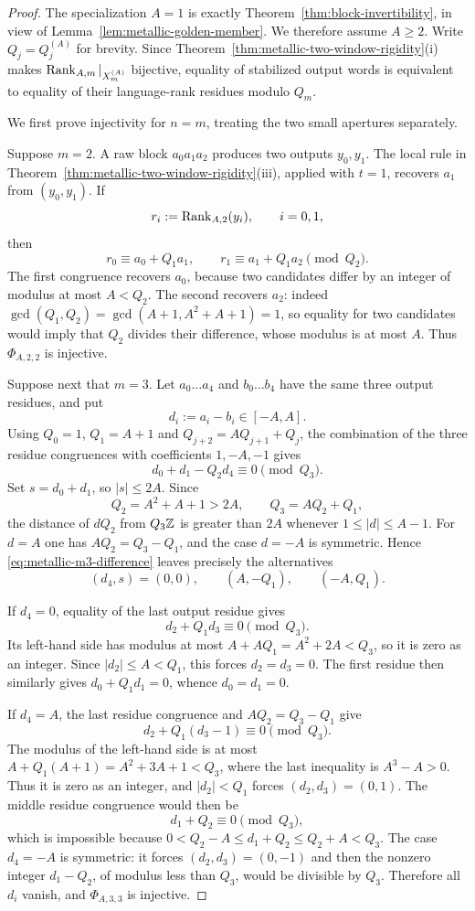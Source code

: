 \begin{proof}
The specialization $A=1$ is exactly
Theorem~\ref{thm:block-invertibility}, in view of
Lemma~\ref{lem:metallic-golden-member}.  We therefore assume $A\ge2$.
Write $Q_j=Q_j^{(A)}$ for brevity.  Since
Theorem~\ref{thm:metallic-two-window-rigidity}(i) makes
$\operatorname{Rank}_{A,m}|_{X_m^{(A)}}$ bijective, equality of stabilized output words is
equivalent to equality of their language-rank residues modulo $Q_m$.

We first prove injectivity for $n=m$, treating the two small apertures
separately.

Suppose $m=2$.  A raw block $a_0a_1a_2$ produces two outputs
$y_0,y_1$.  The local rule in
Theorem~\ref{thm:metallic-two-window-rigidity}(iii), applied with $t=1$,
recovers $a_1$ from $(y_0,y_1)$.  If
\[
r_i:=\operatorname{Rank}_{A,2}(y_i),\qquad i=0,1,
\]
then
\[
r_0\equiv a_0+Q_1a_1,\qquad
r_1\equiv a_1+Q_1a_2\pmod {Q_2}.
\]
The first congruence recovers $a_0$, because two candidates differ by an
integer of modulus at most $A<Q_2$.  The second recovers $a_2$: indeed
$\gcd(Q_1,Q_2)=\gcd(A+1,A^2+A+1)=1$, so equality for two candidates would
imply that $Q_2$ divides their difference, whose modulus is at most $A$.
Thus $\Phi_{A,2,2}$ is injective.

Suppose next that $m=3$.  Let $a_0\ldots a_4$ and $b_0\ldots b_4$ have the
same three output residues, and put
\[
d_i:=a_i-b_i\in[-A,A].
\]
Using $Q_0=1$, $Q_1=A+1$ and
$Q_{j+2}=AQ_{j+1}+Q_j$, the combination of the three residue congruences
with coefficients $1,-A,-1$ gives
\begin{equation}\label{eq:metallic-m3-difference}
d_0+d_1-Q_2d_4\equiv0\pmod {Q_3}.
\end{equation}
Set $s=d_0+d_1$, so $|s|\le2A$.  Since
\[
Q_2=A^2+A+1>2A,\qquad Q_3=AQ_2+Q_1,
\]
the distance of $dQ_2$ from $Q_3\mathbb{Z}$ is greater than $2A$ whenever
$1\le |d|\le A-1$.  For $d=A$ one has
$AQ_2=Q_3-Q_1$, and the case $d=-A$ is symmetric.  Hence
\eqref{eq:metallic-m3-difference} leaves precisely the alternatives
\[
(d_4,s)=(0,0),\qquad (A,-Q_1),\qquad(-A,Q_1).
\]

If $d_4=0$, equality of the last output residue gives
\[
d_2+Q_1d_3\equiv0\pmod {Q_3}.
\]
Its left-hand side has modulus at most $A+AQ_1=A^2+2A<Q_3$, so it is zero
as an integer.  Since $|d_2|\le A<Q_1$, this forces $d_2=d_3=0$.  The first
residue then similarly gives $d_0+Q_1d_1=0$, whence $d_0=d_1=0$.

If $d_4=A$, the last residue congruence and
$AQ_2=Q_3-Q_1$ give
\[
d_2+Q_1(d_3-1)\equiv0\pmod {Q_3}.
\]
The modulus of the left-hand side is at most
$A+Q_1(A+1)=A^2+3A+1<Q_3$, where the last inequality is
$A^3-A>0$.  Thus it is zero as an integer, and
$|d_2|<Q_1$ forces $(d_2,d_3)=(0,1)$.  The middle residue congruence would
then be
\[
d_1+Q_2\equiv0\pmod {Q_3},
\]
which is impossible because
$0<Q_2-A\le d_1+Q_2\le Q_2+A<Q_3$.  The case $d_4=-A$ is symmetric: it
forces $(d_2,d_3)=(0,-1)$ and then the nonzero integer $d_1-Q_2$, of modulus
less than $Q_3$, would be divisible by $Q_3$.  Therefore all $d_i$ vanish,
and $\Phi_{A,3,3}$ is injective.


\end{proof}
